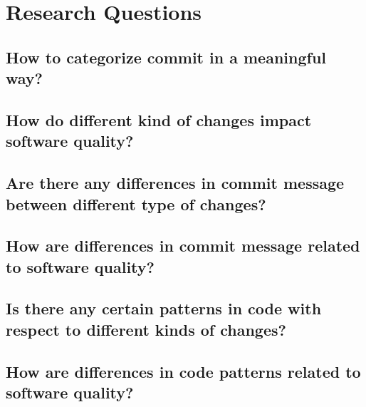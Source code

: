 \section{Research Questions}
\subsection{How to categorize commit in a meaningful way?}
\subsection{How do different kind of changes impact software quality?}
\subsection{Are there any differences in commit message between different type of changes?}
\subsection{How are differences in commit message related to software quality?}
\subsection{Is there any certain patterns in code with respect to different kinds of changes?}
\subsection{How are differences in code patterns related to software quality?}